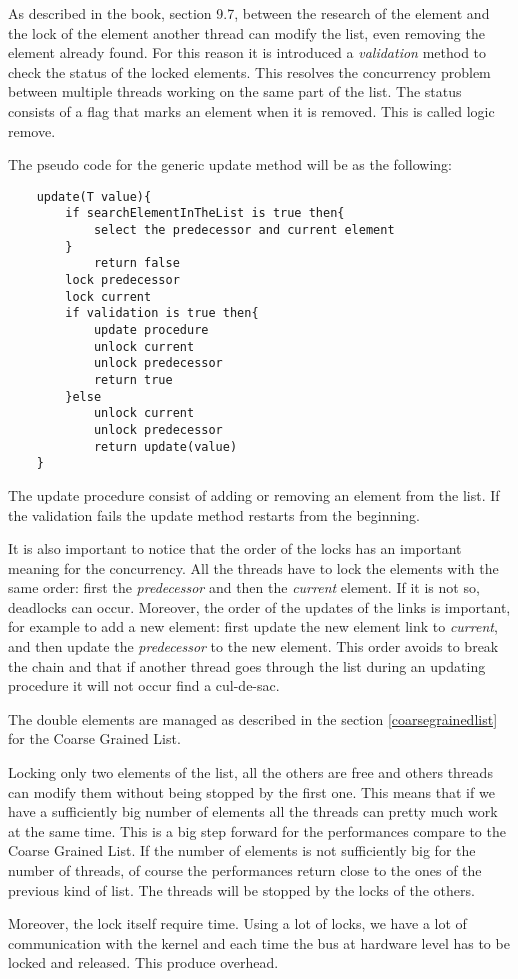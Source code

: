 As described in the book, section 9.7, between the research of the element and the lock of the element another thread can modify the list, even removing the element already found. For this reason it is introduced a \emph{validation} method to check the status of the locked elements. This resolves the concurrency problem between multiple threads working on the same part of the list. The status consists of a flag that marks an element when it is removed. This is called logic remove.\newline

The pseudo code for the generic update method will be as the following:\newline

\begin{lstlisting}
	update(T value){
		if searchElementInTheList is true then{
			select the predecessor and current element
		}
			return false
		lock predecessor 
		lock current
		if validation is true then{
			update procedure
			unlock current
			unlock predecessor
			return true
		}else
			unlock current
			unlock predecessor
			return update(value)
	}
\end{lstlisting}

The update procedure consist of adding or removing an element from the list. If the validation fails the update method restarts from the beginning.


It is also important to notice that the order of the locks has an important meaning for the concurrency. All the threads have to lock the elements with the same order: first the \emph{predecessor} and then the \emph{current} element. If it is not so, deadlocks can occur. Moreover, the order of the updates of the links is important, for example to add a new element: first update the new element link to \emph{current}, and then update the \emph{predecessor} to the new element. This order avoids to break the chain and that if another thread goes through the list during an updating procedure it will not occur find a cul-de-sac.


The double elements are managed as described in the section \ref{coarsegrainedlist} for the Coarse Grained List.\newline


Locking only two elements of the list, all the others are free and others threads can modify them without being stopped by the first one. This means that if we have a sufficiently big number of elements all the threads can pretty much work at the same time. This is a big step forward for the performances compare to the Coarse Grained List. If the number of elements is not sufficiently big for the number of threads, of course the performances return close to the ones of the previous kind of list. The threads will be stopped by the locks of the others. 

Moreover, the lock itself require time. Using a lot of locks, we have a lot of communication with the kernel and each time the bus at hardware level has to be locked and released. This produce overhead.






